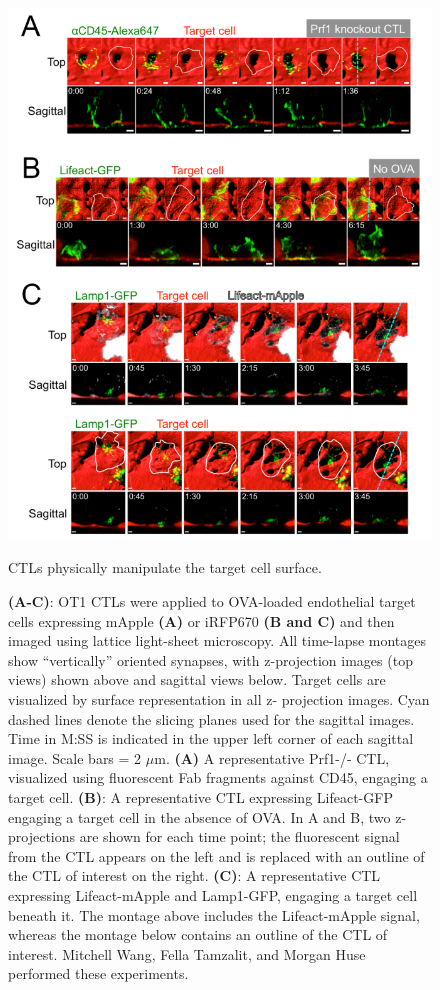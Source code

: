 \begin{figure}[htbp]
	\centering
	\includegraphics[width=\textwidth]{../figures/chapter2/fig7supp.png}
	\caption{CTLs physically manipulate the target cell surface.}
	\caption*{\textbf{(A-C)}: OT1 CTLs were applied to OVA-loaded endothelial target cells expressing mApple \textbf{(A)} or iRFP670 \textbf{(B and C)} and then imaged using lattice light-sheet microscopy. All time-lapse montages show “vertically” oriented synapses, with z-projection images (top views) shown above and sagittal views below. Target cells are visualized by surface representation in all z- projection images. Cyan dashed lines denote the slicing planes used for the sagittal images. Time in M:SS is indicated in the upper left corner of each sagittal image. Scale bars = 2 $\mu$m. \textbf{(A)} A representative Prf1-/- CTL, visualized using fluorescent Fab fragments against CD45, engaging a target cell. \textbf{(B)}: A representative CTL expressing Lifeact-GFP engaging a target cell in the absence of OVA. In A and B, two z-projections are shown for each time point; the fluorescent signal from the CTL appears on the left and is replaced with an outline of the CTL of interest on the right. \textbf{(C)}: A representative CTL expressing Lifeact-mApple and Lamp1-GFP, engaging a target cell beneath it. The montage above includes the Lifeact-mApple signal, whereas the montage below contains an outline of the CTL of interest. Mitchell Wang, Fella Tamzalit, and Morgan Huse performed these experiments.}
	\label{fig:fig7supp}
\end{figure}

